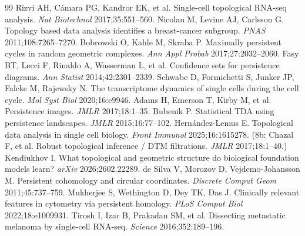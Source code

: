 \documentclass[11pt,a4paper]{article}
\begin{document}
\begin{thebibliography}{99}\small
{} Rizvi AH, C\'amara PG, Kandror EK, et al. Single-cell topological RNA-seq analysis. \emph{Nat Biotechnol} 2017;35:551--560.
 Nicolau M, Levine AJ, Carlsson G. Topology based data analysis identifies a breast-cancer subgroup. \emph{PNAS} 2011;108:7265--7270.
 Bobrowski O, Kahle M, Skraba P. Maximally persistent cycles in random geometric complexes. \emph{Ann Appl Probab} 2017;27:2032--2060.
 Fasy BT, Lecci F, Rinaldo A, Wasserman L, et al. Confidence sets for persistence diagrams. \emph{Ann Statist} 2014;42:2301--2339.
 Schwabe D, Formichetti S, Junker JP, Falcke M, Rajewsky N. The transcriptome dynamics of single cells during the cell cycle. \emph{Mol Syst Biol} 2020;16:e9946.
 Adams H, Emerson T, Kirby M, et al. Persistence images. \emph{JMLR} 2017;18:1--35.
 Bubenik P. Statistical TDA using persistence landscapes. \emph{JMLR} 2015;16:77--102.
 Hern\'andez-Lemus E. Topological data analysis in single cell biology. \emph{Front Immunol} 2025;16:1615278. (8b: Chazal F, et al. Robust topological inference / DTM filtrations. \emph{JMLR} 2017;18:1--40.)
 Kendiukhov I. What topological and geometric structure do biological foundation models learn? \emph{arXiv} 2026;2602.22289.
 de Silva V, Morozov D, Vejdemo-Johansson M. Persistent cohomology and circular coordinates. \emph{Discrete Comput Geom} 2011;45:737--759.
 Mukherjee S, Wethington D, Dey TK, Das J. Clinically relevant features in cytometry via persistent homology. \emph{PLoS Comput Biol} 2022;18:e1009931.
 Tirosh I, Izar B, Prakadan SM, et al. Dissecting metastatic melanoma by single-cell RNA-seq. \emph{Science} 2016;352:189--196.
\end{thebibliography}
\end{document}
